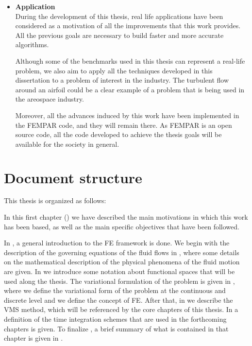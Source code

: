 \begin{itemize}
\item {\bf Application}\\
During the development of this thesis, real life applications have been considered as a motivation of all the improvements that this work provides. All the previous goals are necessary to build faster and more accurate algorithms.

Although some of the benchmarks used in this thesis can represent a real-life problem, we also aim to apply all the techniques developed in this dissertation to a problem of interest in the industry. The turbulent flow around an airfoil could be a clear example of a problem that is being used in the areospace industry.

Moreover, all the advances induced by this work have been implemented in the FEMPAR code, and they will remain there. As FEMPAR is an open source code, all the code developed to achieve the thesis goals will be available for the society in general.


\end{itemize}

\section{Document structure}

This thesis is organized as follows:

In this first chapter () we have described the main motivations in which this work has been based, as well as the main specific objectives that have been followed.

In , a general introduction to the FE framework is done. We begin with the description of the governing equations of the fluid flows in , where some details on the mathematical description of the physical phenomena of the fluid motion are given. In  we introduce some notation about functional spaces that will be used along the thesis. The variational formulation of the problem is given in , where we define the variational form of the problem at the continuous and discrete level and we define the concept of FE. After that, in  we describe the VMS method, which will be referenced by the core chapters of this thesis. In  a definition of the time integration schemes that are used in the forthcoming chapters is given. To finalize , a brief summary of what is contained in that chapter is given in .

